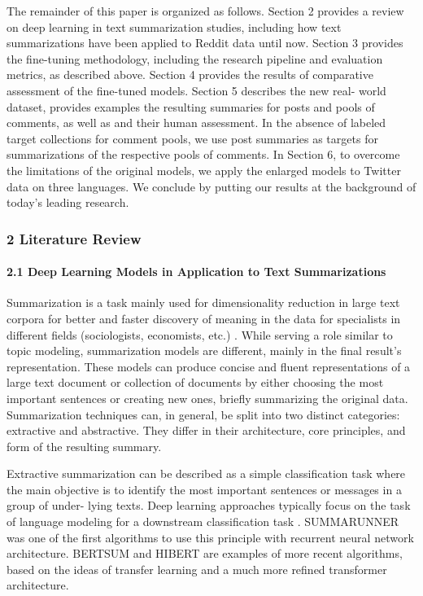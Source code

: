 The remainder of this paper is organized as follows. Section 2 provides a review on deep learning in text summarization studies, including how text summarizations have been applied to Reddit data until now. Section 3 provides the fine-tuning methodology, including the research pipeline and evaluation metrics, as described above. Section 4 provides the results of comparative assessment of the fine-tuned models. Section 5 describes the new real- world dataset, provides examples the resulting summaries for posts and pools of comments, as well as and their human assessment. In the absence of labeled target collections for comment pools, we use post summaries as targets for summarizations of the respective pools of comments. In Section 6, to overcome the limitations of the original models, we apply the enlarged models to Twitter data on three languages. We conclude by putting our results at the background of today’s leading research.

\subsubsection{2 Literature Review}

\paragraph{2.1 Deep Learning Models in Application to Text Summarizations} 
Summarization is a task mainly used for dimensionality reduction in large text corpora for better and faster discovery of meaning in the data for specialists in different fields (sociologists, economists, etc.) \cite{Maybury}. While serving a role similar to topic modeling, summarization models are different, mainly in the final result’s representation. These models can produce concise and fluent representations of a large text document or collection of documents by either choosing the most important sentences or creating new ones, briefly summarizing the original data. Summarization techniques can, in general, be split into two distinct categories: extractive and abstractive. They differ in their architecture, core principles, and form of the resulting summary.

Extractive summarization can be described as a simple classification task where the main objective is to identify the most important sentences or messages in a group of under- lying texts. Deep learning approaches typically focus on the task of language modeling for a downstream classification task \cite{JingXu}. SUMMARUNNER \cite{NallapatiZhaiZhou} was one of the first algorithms to use this principle with recurrent neural network architecture. BERTSUM \cite{Liu2019,LiuLapata} and HIBERT \cite{ZhangWeiZhou} are examples of more recent algorithms, based on the ideas of transfer learning and a much more refined transformer architecture.

